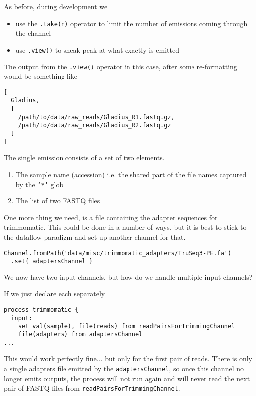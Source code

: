 \begin{note}
As before, during development we
\begin{itemize}
 \item use the \texttt{.take(n)} operator to limit the number of emissions coming through the channel
 \item use \texttt{.view()} to sneak-peak at what exactly is emitted
\end{itemize}
\end{note}

The output from the \texttt{.view()} operator in this case,
after some re-formatting would be something like

\begin{lstlisting}
[
  Gladius, 
  [
    /path/to/data/raw_reads/Gladius_R1.fastq.gz, 
    /path/to/data/raw_reads/Gladius_R2.fastq.gz
  ]
]
\end{lstlisting}

The single emission consists of a set of two elements. 
\begin{enumerate}
\item The sample name (accession) i.e. the shared part of the file names captured by the \texttt{`*'} glob. 
\item The list of two FASTQ files 
\end{enumerate}

One more thing we need, is a file containing the adapter sequences for trimmomatic.
This could be done in a number of ways, but it is best to stick to the dataflow paradigm 
and set-up another channel for that.

\begin{lstlisting}
Channel.fromPath('data/misc/trimmomatic_adapters/TruSeq3-PE.fa')
  .set{ adaptersChannel }
\end{lstlisting}

We now have two input channels, but how do we handle multiple input channels? 

If we just declare each separately 

\begin{lstlisting}
process trimmomatic {
  input:
    set val(sample), file(reads) from readPairsForTrimmingChannel
    file(adapters) from adaptersChannel
...    
\end{lstlisting}

This would work perfectly fine... but only for the first pair of reads. 
There is only a single adapters file emitted by the \texttt{adaptersChannel}, 
so once this channel no longer emits outputs, the process will not run again
and will never read the next pair of FASTQ files from \texttt{readPairsForTrimmingChannel}.

